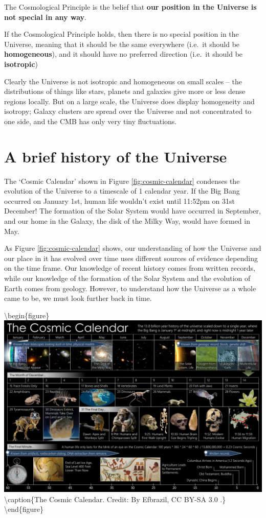 \documentclass[11pt,a4paper]{book}
\begin{document}
The Cosmological Principle is the belief that \textbf{our position in the
Universe is not special in any way}.

If the Cosmological Principle holds, then there is no special position
in the Universe, meaning that it should be the same everywhere (i.e.~it
should be \textbf{homogeneous}), and it should have no preferred direction
(i.e.~it should be \textbf{isotropic})

Clearly the Universe is not isotropic and homogeneous on small scales --
the distributions of things like stars, planets and galaxies give more
or less dense regions locally. But on a large scale, the Universe does
display homogeneity and isotropy; Galaxy clusters are spread over the
Universe and not concentrated to one side, and the CMB has only very
tiny fluctuations.

\hypertarget{sec:history}{%
\section{A brief history of the Universe}\label{sec:history}}

The `Cosmic Calendar' shown in
Figure \ref{fig:cosmic-calendar} condenses the evolution of the Universe
to a timescale of 1 calendar year. If the Big Bang occurred on January
1st, human life wouldn't exist until 11:52pm on 31st December! The
formation of the Solar System would have occurred in September, and our
home in the Galaxy, the disk of the Milky Way, would have formed in May.

As
Figure \ref{fig:cosmic-calendar} shows, our understanding of how the
Universe and our place in it has evolved over time uses different
sources of evidence depending on the time frame. Our knowledge of recent
history comes from written records, while our knowledge of the formation
of the Solar System and the evolution of Earth comes from geology.
However, to understand how the Universe as a whole came to be, we must
look further back in time.

\textbackslash{}begin\{figure\}
\includegraphics[width=1\linewidth]{Images/CosmicCalendar} \textbackslash{}caption\{The Cosmic Calendar. Credit: By Efbrazil, CC BY-SA 3.0 \citep{wikipedia_2020}.\}\label{fig:cosmic-calendar}
\textbackslash{}end\{figure\}
\end{document}
